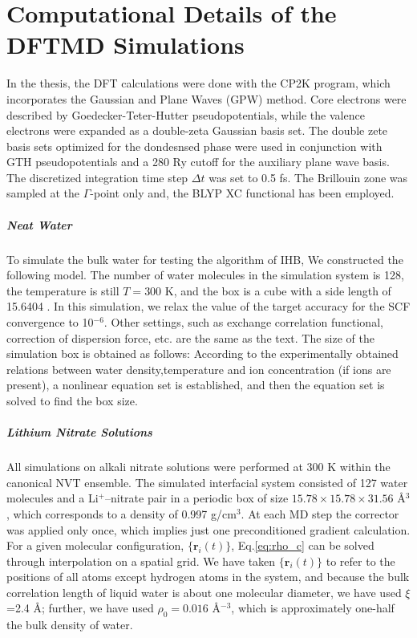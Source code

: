 \chapter{Computational Details of the DFTMD Simulations}\label{computational_detail}
In the thesis, the DFT calculations were done with the CP2K program, which incorporates the Gaussian and Plane Waves (GPW) method\cite{GL99}. 
Core electrons were described by Goedecker-Teter-Hutter pseudopotentials\cite{MK05}, while the valence electrons were expanded as a double-zeta Gaussian basis set.
The double zete basis sets optimized for the dondesnsed phase\cite{VandeVondele2007} were used in conjunction with GTH pseudopotentials\cite{Goedecker1996} 
and a 280 Ry cutoff for the auxiliary plane wave basis.
The discretized integration time step $\Delta t$ was set to 0.5 fs. 
The Brillouin zone was sampled at the $\Gamma$-point only and, the BLYP XC functional has been employed.
\paragraph{Neat Water}\label{DETAILS_NEAT_WATER}
To simulate the bulk water for testing the algorithm of IHB, We constructed the following model. 
The number of water molecules in the simulation system is 128, 
the temperature is still $T=300$ K, and the box is a cube with a side length of 15.6404 \A. 
In this simulation, we relax the value of the target accuracy for the SCF convergence to 10$^{-6}$. 
Other settings, such as exchange correlation functional, correction of dispersion force, etc. are the same as the text. 
The size of the simulation box is obtained as follows: 
According to the experimentally obtained relations between water density,temperature and ion concentration (if ions are present), 
a nonlinear equation set is established, and then the equation set is solved to find the box size.

\paragraph{Lithium Nitrate Solutions}\label{DETAILS_LINO3}
All simulations on alkali nitrate solutions were performed at 300 K within the canonical NVT ensemble. 
The simulated interfacial system consisted of 127 water molecules and a Li$^+$--nitrate pair in a periodic
box of size $15.78 \times 15.78 \times 31.56$ \AA$^3$, which corresponds to
a density of 0.997 g/cm$^3$. 
At each MD step the corrector was applied
only once, which implies just one preconditioned gradient calculation. 
For a given molecular configuration, $\{\mathbf{r}_i (t)\}$, Eq.\thinspace\ref{eq:rho_c} can be
solved through interpolation on a spatial grid.\cite{Willard2010} 
We have taken $\{\mathbf{r}_i (t)\}$ to refer to the positions of all
atoms except hydrogen atoms in the system, and because the bulk correlation length of
liquid water is about one molecular diameter, we have used $\xi$ 
=2.4 \AA; further, we have used $\rho_0= 0.016$ \AA $^{-3}$, which is
approximately one-half the bulk density of water. 

